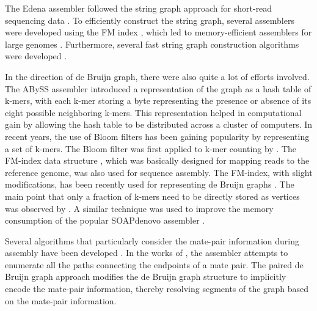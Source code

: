 The Edena assembler followed the string graph approach for short-read sequencing data \citep{hernandez2008novo}. To efficiently construct the string graph, several assemblers were developed using the FM index \citep{simpson2010efficient}, 
which led to memory-efficient assemblers for large genomes \citep{li2012exploring, simpson2012efficient}.
Furthermore, several fast string graph construction algorithms were developed \citep{dinh2011memory, gonnella2012readjoiner, ben2014string}.
 
In the direction of de Bruijn graph, there were also quite a lot of efforts involved.
The ABySS assembler \citep{simpson2009abyss} introduced a representation of
the graph as a hash table of k-mers, with each k-mer storing a byte representing the presence or absence of its eight possible
neighboring k-mers. This representation helped in computational gain by allowing the hash table to be distributed across a cluster
of computers. In recent years, the use of Bloom filters \citep{bloom1970space} has been gaining popularity by representing a set of k-mers.
The Bloom filter was first applied to k-mer counting by \cite{melsted2011efficient}. 
The FM-index data structure \cite{ferragina2000opportunistic}, which was basically designed for mapping reads to the reference genome, was also used for
sequence assembly. 
The FM-index, with slight modifications, has been recently used for representing de Bruijn graphs \citep{bowe2012succinct, rodland2013compact}.
The main point that only a fraction of k-mers need to be directly stored as vertices was observed by \cite{ye2012exploiting}. A similar
technique was used to improve the memory consumption of the popular SOAPdenovo assembler \citep{luo2012soapdenovo2}.

Several algorithms that particularly consider the mate-pair information during assembly have been developed .
 In the works of \citep{butler2008allpaths, bankevich2012spades}, the assembler attempts to enumerate all the paths connecting the endpoints of a mate pair.
The paired de Bruijn graph \citep{medvedev2011paired} approach modifies the de Bruijn graph
structure to implicitly encode the mate-pair information, thereby resolving segments of the graph based on the mate-pair information.
